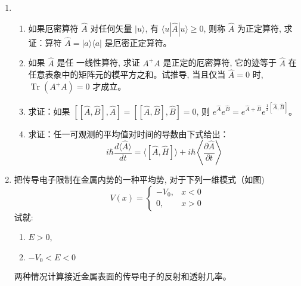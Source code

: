 

\begin{enumerate}
	\item
\begin{enumerate}
	\item
	如果厄密算符 $\hat{A}$ 对任何矢量 $|u\rangle$, 有 $\langle u|\hat{A}| u\rangle \geq 0$, 则称 $\hat{A}$ 为正定算符, 求证：算符 $\hat{A}=|a\rangle\langle a|$ 是厄密正定算符。
	\banswer{
		
	}
	
	\item 
	如果 $\hat{A}$ 是任 一线性算符, 求证 $A^{+} A$ 是正定的厄密算符, 它的迹等于 $\hat{A}$ 在任意表象中的矩阵元的模平方之和。试推导, 当且仅当 $\hat{A}=0$ 时, $\operatorname{Tr}\left(A^{+} A\right)=0$ 才成立。
	
	\banswer{
		
	}
	
	
	\item 
	求证：如果 $[[\hat{A}, \hat{B}], \hat{A}]=[[\hat{A}, \hat{B}], \hat{B}]=0$, 则 $e^{\hat{A}} e^{\hat{B}}=e^{\hat{A}+\hat{B}} e^{\frac{1}{2}[\hat{A}, \hat{B}]}$。
	\banswer{
		
	}
	
	\item 
	求证：任一可观测的平均值对时间的导数由下式给出：
	\[
	i \hbar \frac{d\langle\hat{A}\rangle}{d t}=\langle[\hat{A}, \hat{H}]\rangle+i \hbar\left\langle\frac{\partial \hat{A}}{\partial t}\right\rangle
	\]
	\banswer{
		
	}



	
	
	
\end{enumerate}


	
	\item 
	把传导电子限制在金属内势的一种平均势, 对于下列一维模式（如图)
\[ 
	V(x)=\left\{\begin{array}{cc}
	-V_{0}, & x<0 \\
	0, & x>0
\end{array}\right. 
 \]
	试就:
	\begin{enumerate}
		\item
 $E>0$,
	\item 
	$-V_{0}<E<0$ 
	\end{enumerate}
两种情况计算接近金属表面的传导电子的反射和透射几率。


\end{enumerate}
